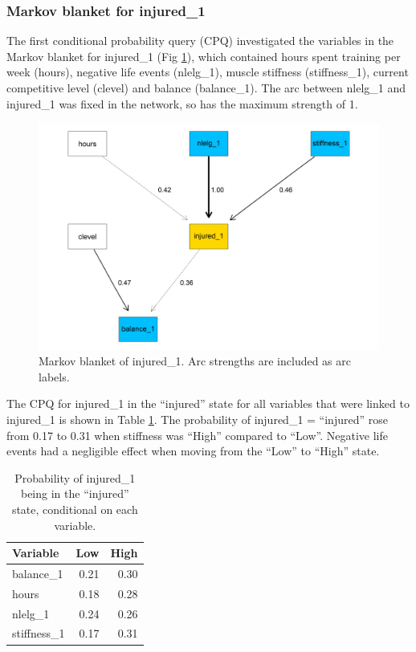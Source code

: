 \documentclass[
  english,
  man,floatsintext]{apa6}
\begin{document}
\hypertarget{markov-blanket-for-injured_1}{%
\subsubsection{Markov blanket for injured\_1}\label{markov-blanket-for-injured_1}}

The first conditional probability query (CPQ) investigated the variables in the Markov blanket for injured\_1 (Fig \ref{fig:fig7}), which contained hours spent training per week (hours), negative life events (nlelg\_1), muscle stiffness (stiffness\_1), current competitive level (clevel) and balance (balance\_1).
The arc between nlelg\_1 and injured\_1 was fixed in the network, so has the maximum strength of 1.

\begin{figure}

{\centering \includegraphics[width=1\linewidth]{figures_doc/Fig7} 

}

\caption{Markov blanket of injured\_1. Arc strengths are included as arc labels.}\label{fig:fig7}
\end{figure}

The CPQ for injured\_1 in the ``injured'' state for all variables that were linked to injured\_1 is shown in Table \ref{tab:table5}.
The probability of injured\_1 = ``injured'' rose from 0.17 to 0.31 when stiffness was ``High'' compared to ``Low''.
Negative life events had a negligible effect when moving from the ``Low'' to ``High'' state.

\begin{table}[H]

\caption{\label{tab:table5}Probability of injured\_1 being in the ``injured'' state, conditional on each variable.}
\centering
\begin{tabular}[t]{l|r|r}
\hline
\textbf{Variable} & \textbf{Low} & \textbf{High}\\
\hline
balance\_1 & 0.21 & 0.30\\
\hline
hours & 0.18 & 0.28\\
\hline
nlelg\_1 & 0.24 & 0.26\\
\hline
stiffness\_1 & 0.17 & 0.31\\
\hline
\end{tabular}
\end{table}
\end{document}

